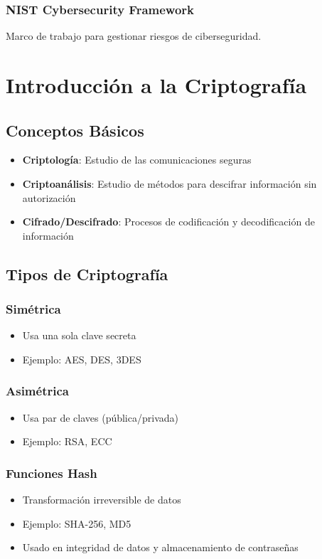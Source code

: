 \documentclass[12pt,a4paper]{article}
\begin{document}
\subsubsection{NIST Cybersecurity Framework}
Marco de trabajo para gestionar riesgos de ciberseguridad.

\section{Introducción a la Criptografía}
\subsection{Conceptos Básicos}
\begin{itemize}
    \item \textbf{Criptología}: Estudio de las comunicaciones seguras
    \item \textbf{Criptoanálisis}: Estudio de métodos para descifrar información sin autorización
    \item \textbf{Cifrado/Descifrado}: Procesos de codificación y decodificación de información
\end{itemize}

\subsection{Tipos de Criptografía}
\subsubsection{Simétrica}
\begin{itemize}
    \item Usa una sola clave secreta
    \item Ejemplo: AES, DES, 3DES
\end{itemize}

\subsubsection{Asimétrica}
\begin{itemize}
    \item Usa par de claves (pública/privada)
    \item Ejemplo: RSA, ECC
\end{itemize}

\subsubsection{Funciones Hash}
\begin{itemize}
    \item Transformación irreversible de datos
    \item Ejemplo: SHA-256, MD5
    \item Usado en integridad de datos y almacenamiento de contraseñas
\end{itemize}
\end{document}

